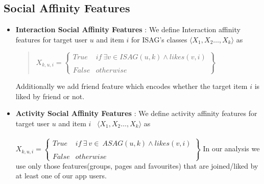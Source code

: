 \subsection{Social Affinity Features}
\begin{itemize}
  \item \textbf{Interaction Social Affinity Features} : We define Interaction affinity features for target user $u$ and item $i$ for ISAG's classes 
  $ \langle X_{1},X_{2}\ldots,X_{k}\rangle$ as
  \begin{quote}
  \begin{math}
   X_{k,u,i} = \begin{Bmatrix}
   		True & if\ \exists v\in ISAG(u,k) \wedge likes(v,i)\\ \\
   		False & otherwise
   \end{Bmatrix}
  \end{math}
  \end{quote}
  Additionally we add friend feature which encodes whether the target item $i$ is liked by friend or not.
  \item \textbf{Activity Social Affinity Features} : We define activity affinity features for target user $u$ and item $i$   \
  $ \langle X_{1},X_{2}\ldots,X_{k}\rangle$ as\\ \\
  \begin{math}
   X_{k,u,i} = \begin{Bmatrix}
   		True & if\ \exists\ v\in \ ASAG(u,k) \wedge likes(v,i)\\ \\
   		False & otherwise
   \end{Bmatrix}
  \end{math}
	In our analysis we use only those features(groups, pages and favourites) that are joined/liked by at least one of our app users.
\end{itemize}

